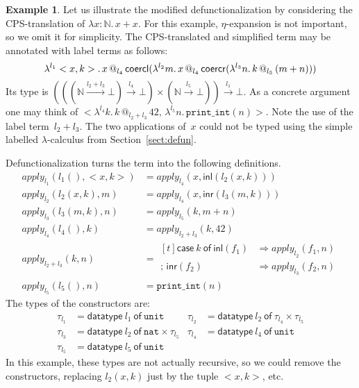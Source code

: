 \documentclass{LMCS}
\makeatletter
\theoremstyle{definition}
\newtheorem{example}[thm]{Example}
\theoremstyle{plain}
\newcommand{\kw}[1]{\mathsf{#1}}
\newcommand{\NN}{\mathbb{N}}
\newcommand{\unit}{\mathtt{unit}}
\newcommand{\VN}{\mathtt{nat}}
\newcommand{\Capply}{\textit{apply}}
\newcommand{\xto}{\xrightarrow}
\newcommand{\tlami}[3]{\lambda {#1}{:}{#2}.\, {#3}}
\newcommand{\tappl}[3]{{#1} {\,@_{#2}\,} {#3}}
\newcommand{\tmcase}[5]{\!\begin{aligned}[t]
  \kw{case}\ #1\ \kw{of}\ 
     \kw{inl}(#2) &\Rightarrow #3 \\[-.27em]
    ;\, \kw{inr}(#4) &\Rightarrow #5    
  \end{aligned}
  }
\makeatother
\begin{document}
\begin{example}
  Let us illustrate the modified defunctionalization
  by considering the CPS-translation of $\tlami x \NN {x + x}$.
  For this example, $\eta$-expansion is not important, so we 
  omit it for simplicity.
  The CPS-translated and simplified term
  may be annotated with label terms as follows: 
  \[
    \lambda^{l_1} <x,k>.\, 
      \tappl x {l_4} 
         {\coercl{l_2+l_3}{\lambda^{l_2} m.\, \tappl x {l_4} {\coercr{l_2+l_3}{\lambda^{l_3} n.\, \tappl k {l_5}{(m+n)}}}}}
  \]
  Its type is
  $(((\NN \xto{l_2 + l_3} \bot) \xto{l_4} \bot) \times (\NN \xto{l_5} \bot)) \xto{l_1} \bot$. 
  As a concrete argument one may think of 
  $<\lambda^{l_4} k.\, \tappl k {l_2 + l_3} 42,\, \lambda^{l_5} n.\, \texttt{print\_int}(n)>$.
  Note the use of the label term~$l_2 + l_3$. The two applications
  of~$x$ could not be typed using the simple labelled $\lambda$-calculus 
  from Section~\ref{sect:defun}.

  Defunctionalization turns the term into the following definitions.
  \begin{align*}
    \Capply_{l_1}(l_1(), <x,k>) &= \Capply_{l_4}(x, \kw{inl}({l_2}(x,k)))
    \\
    \Capply_{l_2}(l_2(x,k), m) &= \Capply_{l_4}(x, \kw{inr}(l_3(m,k)))
    \\
    \Capply_{l_3}(l_3(m,k),n) &= \Capply_{l_5}(k, m+n) 
    \\
    \Capply_{l_4}(l_4(), k) 
    &=  \Capply_{l_2 + l_3}(k, 42)\\
    \Capply_{l_2+l_3}(k, n)  
    &=
    \tmcase k {f_1} {\Capply_{l_2}(f_1, n)} 
    {f_2} {\Capply_{l_3}(f_2, n)} 
    \\
    \Capply_{l_5}(l_5(), n) &= \texttt{print\_int}(n)
  \end{align*}
The types of the constructors are: 
\begin{align*}
  \tau_{l_1} &= \kw{datatype}\ l_1\ \kw{of}\ \unit 
  &
  \tau_{l_2} &= \kw{datatype}\ l_2\ \kw{of}\ \tau_{l_4} \times \tau_{l_5} \\
  \tau_{l_3} &= \kw{datatype}\ l_2\ \kw{of}\ \VN \times \tau_{l_5} 
  &
  \tau_{l_4} &= \kw{datatype}\ l_4\ \kw{of}\ \unit \\
  \tau_{l_5} &= \kw{datatype}\ l_5\ \kw{of}\ \unit 
\end{align*}
In this example, these types are not actually recursive, so 
we could remove the constructors, replacing $l_2(x,k)$ just by
the tuple $<x,k>$, etc.
\end{example}
\end{document}
